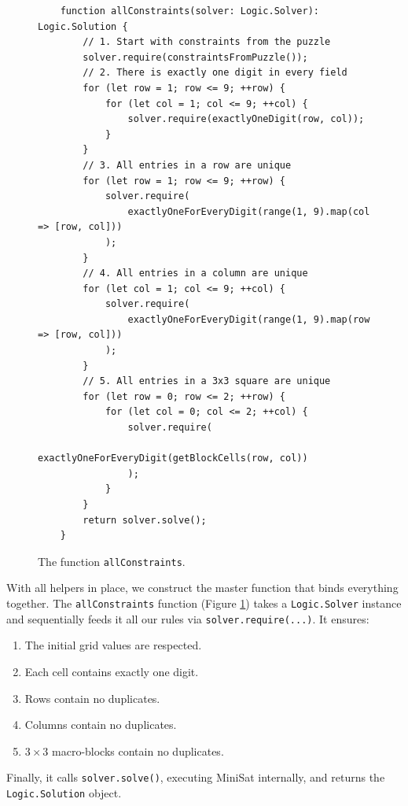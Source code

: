 \begin{figure}[!ht]
  \centering
\begin{verbatim}
    function allConstraints(solver: Logic.Solver): Logic.Solution {
        // 1. Start with constraints from the puzzle
        solver.require(constraintsFromPuzzle());
        // 2. There is exactly one digit in every field
        for (let row = 1; row <= 9; ++row) {
            for (let col = 1; col <= 9; ++col) {
                solver.require(exactlyOneDigit(row, col));
            }
        }
        // 3. All entries in a row are unique
        for (let row = 1; row <= 9; ++row) {
            solver.require(
                exactlyOneForEveryDigit(range(1, 9).map(col => [row, col]))
            );
        }
        // 4. All entries in a column are unique
        for (let col = 1; col <= 9; ++col) {
            solver.require(
                exactlyOneForEveryDigit(range(1, 9).map(row => [row, col]))
            );
        }
        // 5. All entries in a 3x3 square are unique
        for (let row = 0; row <= 2; ++row) {
            for (let col = 0; col <= 2; ++col) {
                solver.require(
                    exactlyOneForEveryDigit(getBlockCells(row, col))
                );
            }
        }
        return solver.solve();
    }
\end{verbatim}
\vspace*{-0.3cm}
  \caption{The function \texttt{allConstraints}.}
  \label{fig:logicsolver-allConstraints}
\end{figure}

With all helpers in place, we construct the master function that binds everything together.
The \texttt{allConstraints} function (Figure \ref{fig:logicsolver-allConstraints}) takes a
\texttt{Logic.Solver} instance and sequentially feeds it all our rules via \texttt{solver.require(...)}. It
ensures: 
\begin{enumerate}
    \item The initial grid values are respected.
    \item Each cell contains exactly one digit.
    \item Rows contain no duplicates.
    \item Columns contain no duplicates.
    \item $3 \times 3$ macro-blocks contain no duplicates.
\end{enumerate}
Finally, it calls \texttt{solver.solve()}, executing MiniSat internally, and returns the \texttt{Logic.Solution} object. 

